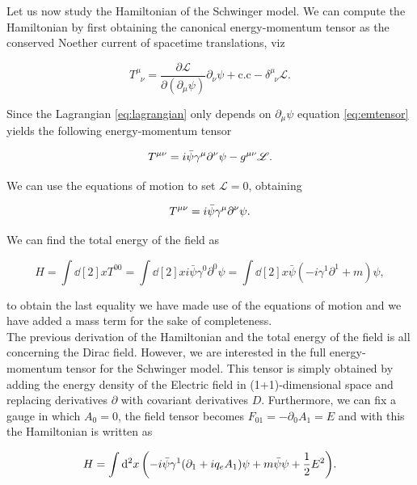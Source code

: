 Let us now study the Hamiltonian of the Schwinger model. We can compute the Hamiltonian by first obtaining the canonical energy-momentum tensor as the conserved Noether current of spacetime translations, viz 

\begin{equation}
T^{\mu}_{\;\;\nu} =  \frac{\partial \mathscr{L}}{\partial(\partial_\mu \psi)}\partial_\nu \psi + \text{c.c} - \delta^{\mu}_{\;\;\nu}\mathscr{L}\label{eq:emtensor}.
\end{equation}

Since the Lagrangian \eqref{eq:lagrangian} only depends on $\partial_\mu \psi$ equation \eqref{eq:emtensor} yields the following energy-momentum tensor 

\begin{equation}
T^{\mu\nu} = i\bar\psi\gamma^\mu\partial^\nu\psi - g^{\mu\nu} \mathscr{L}.
\end{equation}

We can use the equations of motion to set $\mathscr{L}=0$, obtaining

\begin{equation}
T^{\mu\nu} = i\bar\psi\gamma^\mu\partial^\nu\psi.
\end{equation}

We can find the total energy of the field as

\begin{equation}
H = \int \dd[2]{x}T^{00} = \int \dd[2]{x}i\bar\psi\gamma^{0}\partial^{0}\psi = \int \dd[2]{x}\bar\psi(-i\gamma^{1}\partial^{1} + m)\psi,
\end{equation}

to obtain the last equality we have made use of the equations of motion and we have added a mass term for the sake of completeness.\\

The previous derivation of the Hamiltonian and the total energy of the field is all concerning the Dirac field. However, we are interested in the full energy-momentum tensor for the Schwinger model. This tensor is simply obtained by adding the energy density of the Electric field in (1+1)-dimensional space and replacing derivatives $\partial$ with covariant derivatives $D$. Furthermore, we can fix a gauge in which $A_0=0$, the field tensor becomes $F_{01} = -\partial_0A_1 = E$ and with this the Hamiltonian is written as

\begin{equation}
H = \int \dd[2]{x}\qty(-i\bar\psi\gamma^1(\partial_1 + iq_eA_1)\psi + m\bar\psi\psi + \frac{1}{2}E^2).\label{eq:SchHAmil}
\end{equation}


